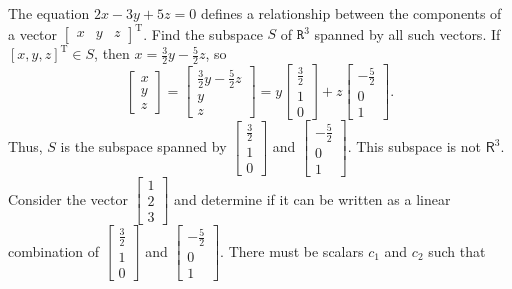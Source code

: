 \documentclass[../main.tex]{subfiles}
\begin{document}
\begin{example} The equation $2 x-3 y+5 z=0$ defines a relationship between the components of a vector $\left[\begin{array}{lll}x & y & z\end{array}\right]^{\mathrm{T}}$. Find the subspace $S$ of $\texttt{R}^{3}$ spanned by all such vectors. If $[x, y, z]^{\mathrm{T}} \in S$, then $x=\frac{3}{2} y-\frac{5}{2} z$, so
$$
\left[\begin{array}{l}
x \\
y \\
z
\end{array}\right]=\left[\begin{array}{l}
\frac{3}{2} y-\frac{5}{2} z \\
y \\
z
\end{array}\right]=y\left[\begin{array}{l}
\frac{3}{2} \\
1 \\
0
\end{array}\right]+z\left[\begin{array}{l}
-\frac{5}{2} \\
0 \\
1
\end{array}\right].
$$
Thus, $S$ is the subspace spanned by $\left[\begin{array}{l}\frac{3}{2} \\ 1 \\ 0\end{array}\right]$ and $\left[\begin{array}{l}-\frac{5}{2} \\ 0 \\ 1\end{array}\right] .$ This subspace is not $\mathsf{R}^{3}$. Consider the vector $\left[ \begin{array}{l}1 \\ 2 \\ 3\end{array}\right]$ and determine if it can be written as a linear combination of $\left[\begin{array}{l}\frac{3}{2} \\ 1 \\ 0\end{array}\right]$ and $\left[\begin{array}{l}-\frac{5}{2} \\ 0 \\ 1\end{array}\right] .$ There must be scalars $c_{1}$ and $c_{2}$ such that

\end{example}
\end{document}
